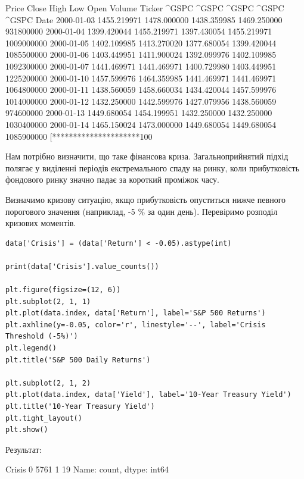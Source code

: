 \begin{console}
Price             Close         High          Low         Open      Volume
Ticker            ^GSPC        ^GSPC        ^GSPC        ^GSPC       ^GSPC
Date                                                                      
2000-01-03  1455.219971  1478.000000  1438.359985  1469.250000   931800000
2000-01-04  1399.420044  1455.219971  1397.430054  1455.219971  1009000000
2000-01-05  1402.109985  1413.270020  1377.680054  1399.420044  1085500000
2000-01-06  1403.449951  1411.900024  1392.099976  1402.109985  1092300000
2000-01-07  1441.469971  1441.469971  1400.729980  1403.449951  1225200000
2000-01-10  1457.599976  1464.359985  1441.469971  1441.469971  1064800000
2000-01-11  1438.560059  1458.660034  1434.420044  1457.599976  1014000000
2000-01-12  1432.250000  1442.599976  1427.079956  1438.560059   974600000
2000-01-13  1449.680054  1454.199951  1432.250000  1432.250000  1030400000
2000-01-14  1465.150024  1473.000000  1449.680054  1449.680054  1085900000
[*********************100%
\end{console}

Нам потрібно визначити, що таке фінансова криза. Загальноприйнятий підхід полягає у виділенні періодів екстремального спаду на ринку, коли прибутковість фондового ринку значно падає за короткий проміжок часу.

Визначимо кризову ситуацію, якщо прибутковість опуститься нижче певного порогового значення (наприклад, -5 $\%$ за один день). Перевіримо розподіл кризових моментів.

\begin{lstlisting}
data['Crisis'] = (data['Return'] < -0.05).astype(int)

print(data['Crisis'].value_counts())

plt.figure(figsize=(12, 6))
plt.subplot(2, 1, 1)
plt.plot(data.index, data['Return'], label='S&P 500 Returns')
plt.axhline(y=-0.05, color='r', linestyle='--', label='Crisis Threshold (-5%)')
plt.legend()
plt.title('S&P 500 Daily Returns')

plt.subplot(2, 1, 2)
plt.plot(data.index, data['Yield'], label='10-Year Treasury Yield')
plt.title('10-Year Treasury Yield')
plt.tight_layout()
plt.show()
\end{lstlisting}

Результат:

\begin{console}
Crisis
0    5761
1      19
Name: count, dtype: int64
\end{console}

